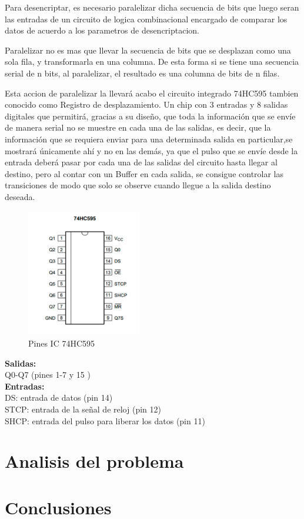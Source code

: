 \documentclass{article}
\begin{document}
Para desencriptar, es necesario paralelizar dicha secuencia de bits que luego seran las entradas de un circuito de logica combinacional encargado de comparar los datos de acuerdo a los parametros de desencriptacion.

Paralelizar no es mas que llevar la secuencia de bits que se desplazan como una sola fila, y transformarla en una columna. De esta forma si se tiene una secuencia serial de n bits, al paralelizar, el resultado es una columna de bits de n filas.

Esta accion de paralelizar la llevará acabo el circuito integrado 74HC595 tambien conocido como Registro de desplazamiento. Un chip con 3 entradas y 8 salidas digitales que permitirá, gracias a su diseño, que toda la información que se envíe de manera serial no se muestre en cada una de las salidas, es decir, que la información que se requiera enviar para una determinada salida en particular,se mostrará únicamente ahí y no en las demás, ya que el pulso que se envíe desde la entrada deberá pasar por cada una de las salidas del circuito hasta llegar al destino, pero al contar con un Buffer en cada salida, se consigue controlar las transiciones de modo que solo se observe cuando llegue a la salida destino deseada.


\begin{figure}[!ht]
\includegraphics[width=5cm]{74HC595.jpg}
\centering
\caption{Pines IC 74HC595}
\end{figure}

\noindent\textbf{Salidas:}\\ 
\indent Q0-Q7 (pines 1-7 y 15 )\\
\textbf{Entradas:}\\
\indent DS: entrada de datos (pin 14)\\
\indent STCP: entrada de la señal de reloj (pin 12)\\
\indent SHCP: entrada del pulso para liberar los datos (pin 11)


\section{Analisis del problema} \label{analisis}



\section{Conclusiones} \label{conclusiones}




\end{document}
